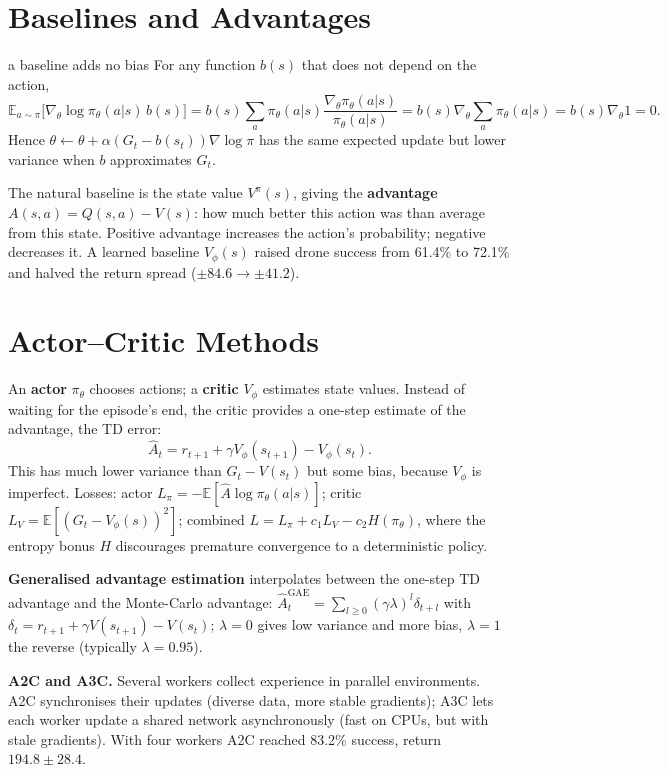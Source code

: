 \documentclass[11pt]{article}
\begin{document}
\section{Baselines and Advantages}
\begin{derivation}{a baseline adds no bias}
For any function $b(s)$ that does not depend on the action,
\[\mathbb E_{a\sim\pi}\big[\nabla_\theta\log\pi_\theta(a|s)\,b(s)\big]=b(s)\sum_a\pi_\theta(a|s)\frac{\nabla_\theta\pi_\theta(a|s)}{\pi_\theta(a|s)}=b(s)\nabla_\theta\sum_a\pi_\theta(a|s)=b(s)\nabla_\theta1=0.\]
Hence $\theta\leftarrow\theta+\alpha(G_t-b(s_t))\nabla\log\pi$ has the same expected update but lower variance when $b$ approximates $G_t$.
\end{derivation}
The natural baseline is the state value $V^\pi(s)$, giving the \textbf{advantage} $A(s,a)=Q(s,a)-V(s)$: how much better this action was than average from this state. Positive advantage increases the action's probability; negative decreases it. A learned baseline $V_\phi(s)$ raised drone success from 61.4\% to 72.1\% and halved the return spread ($\pm84.6\to\pm41.2$).

\section{Actor--Critic Methods}
An \textbf{actor} $\pi_\theta$ chooses actions; a \textbf{critic} $V_\phi$ estimates state values. Instead of waiting for the episode's end, the critic provides a one-step estimate of the advantage, the TD error:
\[\hat A_t=r_{t+1}+\gamma V_\phi(s_{t+1})-V_\phi(s_t).\]
This has much lower variance than $G_t-V(s_t)$ but some bias, because $V_\phi$ is imperfect. Losses: actor $L_\pi=-\mathbb E[\hat A\log\pi_\theta(a|s)]$; critic $L_V=\mathbb E[(G_t-V_\phi(s))^2]$; combined $L=L_\pi+c_1L_V-c_2H(\pi_\theta)$, where the entropy bonus $H$ discourages premature convergence to a deterministic policy.

\textbf{Generalised advantage estimation} interpolates between the one-step TD advantage and the Monte-Carlo advantage: $\hat A^{\text{GAE}}_t=\sum_{l\ge0}(\gamma\lambda)^l\delta_{t+l}$ with $\delta_t=r_{t+1}+\gamma V(s_{t+1})-V(s_t)$; $\lambda=0$ gives low variance and more bias, $\lambda=1$ the reverse (typically $\lambda=0.95$).

\textbf{A2C and A3C.} Several workers collect experience in parallel environments. A2C synchronises their updates (diverse data, more stable gradients); A3C lets each worker update a shared network asynchronously (fast on CPUs, but with stale gradients). With four workers A2C reached 83.2\% success, return $194.8\pm28.4$.
\end{document}
